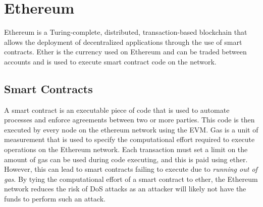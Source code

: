 
\section{Ethereum}

Ethereum is a Turing-complete, distributed, transaction-based blockchain that allows the deployment of decentralized applications through the use of smart contracts. Ether is the currency used on Ethereum and can be traded between accounts and is used to execute smart contract code on the network. 

\subsection{Smart Contracts}

A smart contract is an executable piece of code that is used to automate processes and enforce agreements between two or more parties. This code is then executed by every node on the ethereum network using the EVM.
\x
Gas is a unit of measurement that is used to specify the computational effort required to execute operations on the Ethereum network. Each transaction must set a limit on the amount of gas can be used during code executing, and this is paid using ether. However, this can lead to smart contracts failing to execute due to \textit{running out of gas}.
By tying the computational effort of a smart contract to ether, the Ethereum network reduces the risk of DoS attacks as an attacker will likely not have the funds to perform such an attack.
